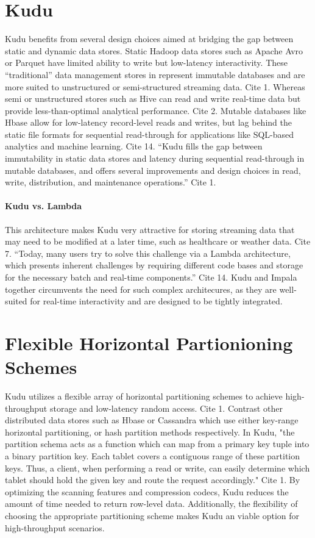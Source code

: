 \section{Kudu}
Kudu benefits from several design choices aimed at bridging the gap between static and dynamic data stores. Static Hadoop data stores such as Apache Avro or Parquet have limited ability to write but low-latency interactivity. These ``traditional'' data management stores in represent immutable databases and are more suited to unstructured or semi-structured streaming data. Cite 1. Whereas semi or unstructured stores such as Hive can read and write real-time data but provide less-than-optimal analytical performance. Cite 2. Mutable databases like Hbase allow for low-latency record-level reads and writes, but lag behind the static file formats for sequential read-through for applications like SQL-based analytics and machine learning.  Cite 14. ``Kudu fills the gap between immutability in static data stores and latency during sequential read-through in mutable databases, and offers several improvements and design choices in read, write, distribution, and maintenance operations.''  Cite 1.

\paragraph{Kudu vs. Lambda}
This architecture makes Kudu very attractive for storing streaming data that may need to be modified at a later time, such as healthcare or weather data. Cite 7. ``Today, many users try to solve this challenge via a Lambda architecture, which presents inherent challenges by requiring different code bases and storage for the necessary batch and real-time components.'' Cite 14. Kudu and Impala together circumvents the need for such complex architecures, as they are well-suited for real-time interactivity and are designed to be tightly integrated.  

\section{Flexible Horizontal Partionioning Schemes}
Kudu utilizes a flexible array of horizontal partitioning schemes to achieve high-throughput storage and low-latency random access. Cite 1. Contrast other distributed data stores such as Hbase or Cassandra which use either key-range horizontal partitioning, or hash partition methods respectively. In Kudu, "the partition schema acts as a function which can map from a primary key tuple into a binary partition key.  Each tablet covers a contiguous  range  of  these partition keys. Thus,  a client, when performing a read or write, can easily determine which tablet should hold the given key and route the request accordingly." Cite 1. By optimizing the scanning features and compression codecs, Kudu reduces the amount of time needed to return row-level data. Additionally, the flexibility of choosing the appropriate partitioning scheme makes Kudu an viable option for high-throughput scenarios. 

